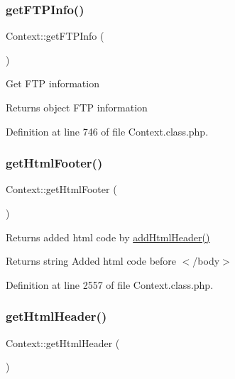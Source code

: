 \mbox{\label{classContext_a4f3473f93028ce5f422135106f125f31}} 
\subsubsection{\texorpdfstring{get\+F\+T\+P\+Info()}{getFTPInfo()}}
{\footnotesize\ttfamily Context\+::get\+F\+T\+P\+Info (\begin{DoxyParamCaption}{ }\end{DoxyParamCaption})}

Get F\+TP information

\begin{DoxyReturn}{Returns}
object F\+TP information 
\end{DoxyReturn}


Definition at line 746 of file Context.\+class.\+php.

\mbox{\label{classContext_ae7bb6879f84366eea76da3a7bf6a40bd}} 
\subsubsection{\texorpdfstring{get\+Html\+Footer()}{getHtmlFooter()}}
{\footnotesize\ttfamily Context\+::get\+Html\+Footer (\begin{DoxyParamCaption}{ }\end{DoxyParamCaption})}

Returns added html code by \hyperlink{classContext_a26a1aea944ae54bb826500f544a67950}{add\+Html\+Header()}

\begin{DoxyReturn}{Returns}
string Added html code before $<$/body$>$ 
\end{DoxyReturn}


Definition at line 2557 of file Context.\+class.\+php.

\mbox{\label{classContext_a302e4b5d868e7a5c8bee216f774ca244}} 
\subsubsection{\texorpdfstring{get\+Html\+Header()}{getHtmlHeader()}}
{\footnotesize\ttfamily Context\+::get\+Html\+Header (\begin{DoxyParamCaption}{ }\end{DoxyParamCaption})}

